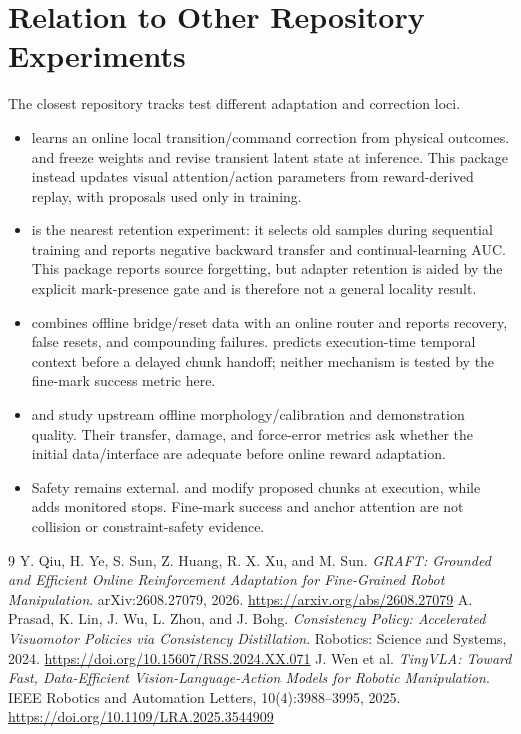 \documentclass[11pt]{article}
\begin{document}
\section{Relation to Other Repository Experiments}

The closest repository tracks test different adaptation and correction loci.
\begin{itemize}[leftmargin=1.5em]
  \item {} learns an online local transition/command correction from physical outcomes.  and  freeze weights and revise transient latent state at inference. This package instead updates visual attention/action parameters from reward-derived replay, with proposals used only in training.
  \item {} is the nearest retention experiment: it selects old samples during sequential training and reports negative backward transfer and continual-learning AUC. This package reports source forgetting, but adapter retention is aided by the explicit mark-presence gate and is therefore not a general locality result.
  \item {} combines offline bridge/reset data with an online router and reports recovery, false resets, and compounding failures.  predicts execution-time temporal context before a delayed chunk handoff; neither mechanism is tested by the fine-mark success metric here.
  \item {} and  study upstream offline morphology/calibration and demonstration quality. Their transfer, damage, and force-error metrics ask whether the initial data/interface are adequate before online reward adaptation.
  \item Safety remains external.  and  modify proposed chunks at execution, while  adds monitored stops. Fine-mark success and anchor attention are not collision or constraint-safety evidence.
\end{itemize}

\begin{thebibliography}{9}
 Y. Qiu, H. Ye, S. Sun, Z. Huang, R. X. Xu, and M. Sun. \emph{GRAFT: Grounded and Efficient Online Reinforcement Adaptation for Fine-Grained Robot Manipulation}. arXiv:2608.27079, 2026. \url{https://arxiv.org/abs/2608.27079}
 A. Prasad, K. Lin, J. Wu, L. Zhou, and J. Bohg. \emph{Consistency Policy: Accelerated Visuomotor Policies via Consistency Distillation}. Robotics: Science and Systems, 2024. \url{https://doi.org/10.15607/RSS.2024.XX.071}
 J. Wen et al. \emph{TinyVLA: Toward Fast, Data-Efficient Vision-Language-Action Models for Robotic Manipulation}. IEEE Robotics and Automation Letters, 10(4):3988--3995, 2025. \url{https://doi.org/10.1109/LRA.2025.3544909}
\end{thebibliography}
\end{document}
